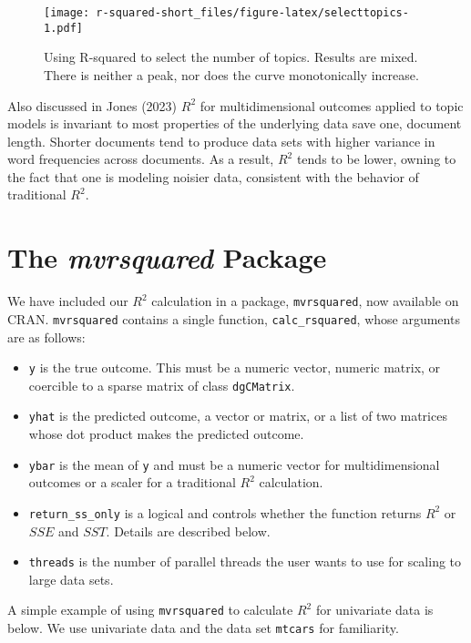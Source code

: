\begin{figure}
\centering
\texttt{[image: r-squared-short\_files/figure-latex/selecttopics-1.pdf]}
\caption{\label{fig:selecttopics}Using R-squared to select the number of topics. Results are mixed. There is neither a peak, nor does the curve monotonically increase.}
\end{figure}

Also discussed in Jones (2023) \(R^2\) for multidimensional outcomes applied to topic models is invariant to most properties of the underlying data save one, document length. Shorter documents tend to produce data sets with higher variance in word frequencies across documents. As a result, \(R^2\) tends to be lower, owning to the fact that one is modeling noisier data, consistent with the behavior of traditional \(R^2\).

\hypertarget{the-mvrsquared-package}{%
\section{\texorpdfstring{The \emph{mvrsquared} Package}{The mvrsquared Package}}\label{the-mvrsquared-package}}

We have included our \(R^2\) calculation in a package, \texttt{mvrsquared}, now available on CRAN. \texttt{mvrsquared} contains a single function, \texttt{calc\_rsquared}, whose arguments are as follows:

\begin{itemize}
\tightlist
\item
  \texttt{y} is the true outcome. This must be a numeric vector, numeric matrix, or coercible to a sparse matrix of class \texttt{dgCMatrix}.
\item
  \texttt{yhat} is the predicted outcome, a vector or matrix, or a list of two matrices whose dot product makes the predicted outcome.
\item
  \texttt{ybar} is the mean of \texttt{y} and must be a numeric vector for multidimensional outcomes or a scaler for a traditional \(R^2\) calculation.
\item
  \texttt{return\_ss\_only} is a logical and controls whether the function returns \(R^2\) or \(SSE\) and \(SST\). Details are described below.
\item
  \texttt{threads} is the number of parallel threads the user wants to use for scaling to large data sets.
\end{itemize}

A simple example of using \texttt{mvrsquared} to calculate \(R^2\) for univariate data is below. We use univariate data and the data set \texttt{mtcars} for familiarity.

